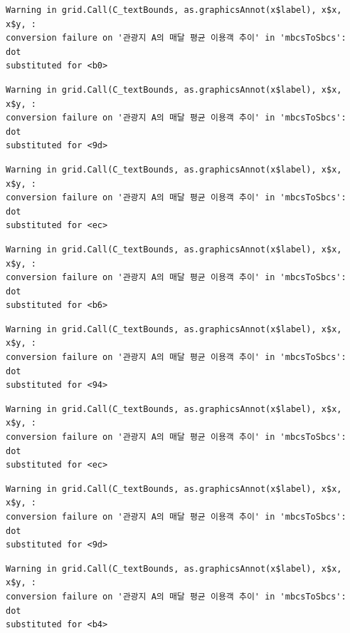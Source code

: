\documentclass[
  letterpaper,
  DIV=11,
  numbers=noendperiod]{scrreprt}
\begin{document}
\begin{verbatim}
Warning in grid.Call(C_textBounds, as.graphicsAnnot(x$label), x$x, x$y, :
conversion failure on '관광지 A의 매달 평균 이용객 추이' in 'mbcsToSbcs': dot
substituted for <b0>
\end{verbatim}

\begin{verbatim}
Warning in grid.Call(C_textBounds, as.graphicsAnnot(x$label), x$x, x$y, :
conversion failure on '관광지 A의 매달 평균 이용객 추이' in 'mbcsToSbcs': dot
substituted for <9d>
\end{verbatim}

\begin{verbatim}
Warning in grid.Call(C_textBounds, as.graphicsAnnot(x$label), x$x, x$y, :
conversion failure on '관광지 A의 매달 평균 이용객 추이' in 'mbcsToSbcs': dot
substituted for <ec>
\end{verbatim}

\begin{verbatim}
Warning in grid.Call(C_textBounds, as.graphicsAnnot(x$label), x$x, x$y, :
conversion failure on '관광지 A의 매달 평균 이용객 추이' in 'mbcsToSbcs': dot
substituted for <b6>
\end{verbatim}

\begin{verbatim}
Warning in grid.Call(C_textBounds, as.graphicsAnnot(x$label), x$x, x$y, :
conversion failure on '관광지 A의 매달 평균 이용객 추이' in 'mbcsToSbcs': dot
substituted for <94>
\end{verbatim}

\begin{verbatim}
Warning in grid.Call(C_textBounds, as.graphicsAnnot(x$label), x$x, x$y, :
conversion failure on '관광지 A의 매달 평균 이용객 추이' in 'mbcsToSbcs': dot
substituted for <ec>
\end{verbatim}

\begin{verbatim}
Warning in grid.Call(C_textBounds, as.graphicsAnnot(x$label), x$x, x$y, :
conversion failure on '관광지 A의 매달 평균 이용객 추이' in 'mbcsToSbcs': dot
substituted for <9d>
\end{verbatim}

\begin{verbatim}
Warning in grid.Call(C_textBounds, as.graphicsAnnot(x$label), x$x, x$y, :
conversion failure on '관광지 A의 매달 평균 이용객 추이' in 'mbcsToSbcs': dot
substituted for <b4>
\end{verbatim}
\end{document}
